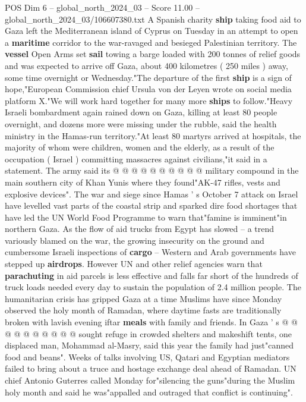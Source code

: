 \begin{textsample}{POS Dim 6 – global\_north\_2024\_03 – Score 11.00 – global\_north\_2024\_03/106607380.txt}  \label{ex:f6_pos_053}
A Spanish charity \textbf{ship} taking food aid to Gaza left the Mediterranean island of Cyprus on Tuesday in an attempt to open a \textbf{maritime} corridor to the war-ravaged and besieged Palestinian territory.
The \textbf{vessel} Open Arms set \textbf{sail} towing a barge loaded with 200 tonnes of relief goods and was expected to arrive off Gaza, about 400 kilometres ( 250 miles ) away, some time overnight or Wednesday."The departure of the first \textbf{ship} is a sign of hope,"European Commission chief Ursula von der Leyen wrote on social media platform X."We will work hard together for many more \textbf{ships} to follow."Heavy Israeli bombardment again rained down on Gaza, killing at least 80 people overnight, and dozens more were missing under the rubble, said the health ministry in the Hamas-run territory."At least 80 martyrs arrived at hospitals, the majority of whom were children, women and the elderly, as a result of the occupation ( Israel ) committing massacres against civilians,"it said in a statement.
The army said its @ @ @ @ @ @ @ @ @ @ military compound in the main southern city of Khan Yunis where they found"AK-47 rifles, vests and explosive devices".
The war and siege since Hamas ' s October 7 attack on Israel have levelled vast parts of the coastal strip and sparked dire food shortages that have led the UN World Food Programme to warn that"famine is imminent"in northern Gaza.
As the flow of aid trucks from Egypt has slowed -- a trend variously blamed on the war, the growing insecurity on the ground and cumbersome Israeli inspections of \textbf{cargo} -- Western and Arab governments have stepped up \textbf{airdrops}.
However UN and other relief agencies warn that \textbf{parachuting} in aid parcels is less effective and falls far short of the hundreds of truck loads needed every day to sustain the population of 2.4 million people.
The humanitarian crisis has gripped Gaza at a time Muslims have since Monday observed the holy month of Ramadan, where daytime fasts are traditionally broken with lavish evening iftar \textbf{meals} with family and friends.
In Gaza ' s @ @ @ @ @ @ @ @ @ @ sought refuge in crowded shelters and makeshift tents, one displaced man, Mohammad al-Masry, said this year the family had just"canned food and beans".
Weeks of talks involving US, Qatari and Egyptian mediators failed to bring about a truce and hostage exchange deal ahead of Ramadan.
UN chief Antonio Guterres called Monday for"silencing the guns"during the Muslim holy month and said he was"appalled and outraged that conflict is continuing".

\end{textsample}

